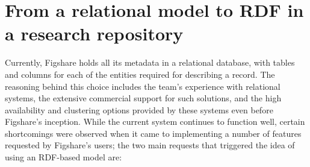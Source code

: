 \section{From a relational model to RDF in a research repository}
\label{sec:tordf}

Currently, Figshare holds all its metadata in a relational database, with tables and columns for each of the entities required for describing a record. The reasoning behind this choice includes the team's experience with relational systems, the extensive commercial support for such solutions, and the high availability and clustering options provided by these systems even before Figshare's inception. While the current system continues to function well, certain shortcomings were observed when it came to implementing a number of features requested by Figshare's users; the two main requests that triggered the idea of using an RDF-based model are:

